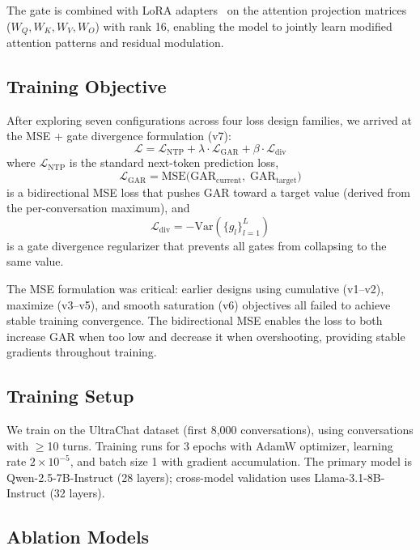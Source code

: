 \documentclass[11pt,a4paper]{article}
\newcommand{\gar}{\textsc{GAR}}
\begin{document}
The gate is combined with LoRA adapters~\cite{hu2022lora} on the attention projection matrices ($W_Q, W_K, W_V, W_O$) with rank 16, enabling the model to jointly learn modified attention patterns and residual modulation.

\subsection{Training Objective}

After exploring seven configurations across four loss design families, we arrived at the MSE + gate divergence formulation (v7):
\begin{equation}
    \mathcal{L} = \mathcal{L}_{\text{NTP}} + \lambda \cdot \mathcal{L}_{\text{GAR}} + \beta \cdot \mathcal{L}_{\text{div}}
\end{equation}
where $\mathcal{L}_{\text{NTP}}$ is the standard next-token prediction loss,
\begin{equation}
    \mathcal{L}_{\text{GAR}} = \text{MSE}\big(\text{GAR}_{\text{current}},\; \text{GAR}_{\text{target}}\big)
\end{equation}
is a bidirectional MSE loss that pushes \gar{} toward a target value (derived from the per-conversation maximum), and
\begin{equation}
    \mathcal{L}_{\text{div}} = -\text{Var}(\{g_l\}_{l=1}^{L})
\end{equation}
is a gate divergence regularizer that prevents all gates from collapsing to the same value.

The MSE formulation was critical: earlier designs using cumulative (v1--v2), maximize (v3--v5), and smooth saturation (v6) objectives all failed to achieve stable training convergence.
The bidirectional MSE enables the loss to both increase \gar{} when too low and decrease it when overshooting, providing stable gradients throughout training.

\subsection{Training Setup}

We train on the UltraChat dataset (first 8,000 conversations), using conversations with $\geq$10 turns.
Training runs for 3 epochs with AdamW optimizer, learning rate $2 \times 10^{-5}$, and batch size 1 with gradient accumulation.
The primary model is Qwen-2.5-7B-Instruct (28 layers); cross-model validation uses Llama-3.1-8B-Instruct (32 layers).

\subsection{Ablation Models}
\end{document}
